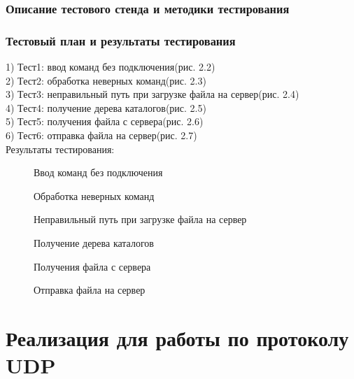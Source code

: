 \documentclass[12pt,a4paper]{report}
\begin{document}
\subsection{Описание тестового стенда и методики тестирования}
\subsection{Тестовый план и результаты тестирования}
1) Тест1: ввод команд без подключения(рис. 2.2)\\
2) Тест2: обработка неверных команд(рис. 2.3)\\
3) Тест3: неправильный путь при загрузке файла на сервер(рис. 2.4)\\
4) Тест4: получение дерева каталогов(рис. 2.5)\\
5) Тест5: получения файла с сервера(рис. 2.6)\\
6) Тест6: отправка файла на сервер(рис. 2.7)\\

Результаты тестирования:\\
			\begin{figure}[h!]
				\caption{Ввод команд без подключения}
				\label{img:test1}
			\end{figure}
			\begin{figure}[h!]
				\caption{Обработка неверных команд}
				\label{img:test2}
			\end{figure}
			\begin{figure}[h!]
				\caption{Неправильный путь при загрузке файла на сервер}
				\label{img:test3}
			\end{figure}
			\begin{figure}[h!]
				\caption{Получение дерева каталогов}
				\label{img:test4}
			\end{figure}
			\begin{figure}[h!]
				\caption{Получения файла с сервера}
				\label{img:test5}
			\end{figure}
			\begin{figure}[h!]
				\caption{Отправка файла на сервер}
				\label{img:test6}
			\end{figure}

\chapter{Реализация для работы по протоколу UDP}
\end{document}
